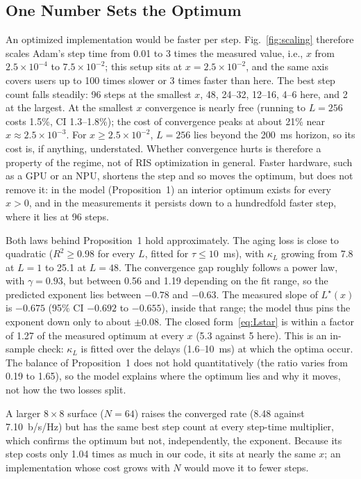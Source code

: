 \subsection{One Number Sets the Optimum}
\label{sec:res_scaling}
An optimized implementation would be faster per step. Fig.~\ref{fig:scaling} therefore scales Adam's step time from 0.01 to 3 times the measured value, i.e., $x$ from $2.5\times10^{-4}$ to $7.5\times10^{-2}$; this setup sits at $x=2.5\times10^{-2}$, and the same axis covers users up to 100 times slower or 3 times faster than here. The best step count falls steadily: 96 steps at the smallest $x$, 48, 24--32, 12--16, 4--6 here, and 2 at the largest. At the smallest $x$ convergence is nearly free (running to $L=256$ costs 1.5\%, CI 1.3--1.8\%); the cost of convergence peaks at about 21\% near $x\approx 2.5\times10^{-3}$. For $x\ge 2.5\times10^{-2}$, $L=256$ lies beyond the 200~ms horizon, so its cost is, if anything, understated. Whether convergence hurts is therefore a property of the regime, not of RIS optimization in general. Faster hardware, such as a GPU or an NPU, shortens the step and so moves the optimum, but does not remove it: in the model (Proposition~1) an interior optimum exists for every $x>0$, and in the measurements it persists down to a hundredfold faster step, where it lies at 96 steps.

Both laws behind Proposition~1 hold approximately. The aging loss is close to quadratic ($R^2\ge 0.98$ for every $L$, fitted for $\tau\le 10$~ms), with $\kappa_L$ growing from 7.8 at $L=1$ to 25.1 at $L=48$. The convergence gap roughly follows a power law, with $\gamma=0.93$, but between 0.56 and 1.19 depending on the fit range, so the predicted exponent lies between $-0.78$ and $-0.63$. The measured slope of $L^\star(x)$ is $-0.675$ (95\% CI $-0.692$ to $-0.655$), inside that range; the model thus pins the exponent down only to about $\pm 0.08$. The closed form~\eqref{eq:Lstar} is within a factor of 1.27 of the measured optimum at every $x$ (5.3 against 5 here). This is an in-sample check: $\kappa_L$ is fitted over the delays (1.6--10~ms) at which the optima occur. The balance of Proposition~1 does not hold quantitatively (the ratio varies from 0.19 to 1.65), so the model explains where the optimum lies and why it moves, not how the two losses split.

A larger $8\times 8$ surface ($N=64$) raises the converged rate (8.48 against 7.10~b/s/Hz) but has the same best step count at every step-time multiplier, which confirms the optimum but not, independently, the exponent. Because its step costs only 1.04 times as much in our code, it sits at nearly the same $x$; an implementation whose cost grows with $N$ would move it to fewer steps.

